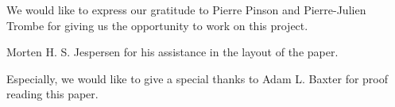 
We would like to express our gratitude to Pierre Pinson and Pierre-Julien Trombe for giving us the opportunity to work on this project.

Morten H. S. Jespersen for his assistance in the layout of the paper.

Especially, we would like to give a special thanks to Adam L. Baxter for proof reading this paper.